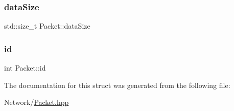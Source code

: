 \mbox{\label{structPacket_a9add4f81e6a9256f5a413697a4626d5b}} 
\subsubsection{\texorpdfstring{data\+Size}{dataSize}}
{\footnotesize\ttfamily std\+::size\+\_\+t Packet\+::data\+Size}

\mbox{\label{structPacket_a354ba55bd6aec819bbe3379fb402f712}} 
\subsubsection{\texorpdfstring{id}{id}}
{\footnotesize\ttfamily int Packet\+::id}



The documentation for this struct was generated from the following file\+:\begin{DoxyCompactItemize}
\item 
Network/\mbox{\hyperlink{Packet_8hpp}{Packet.\+hpp}}\end{DoxyCompactItemize}
